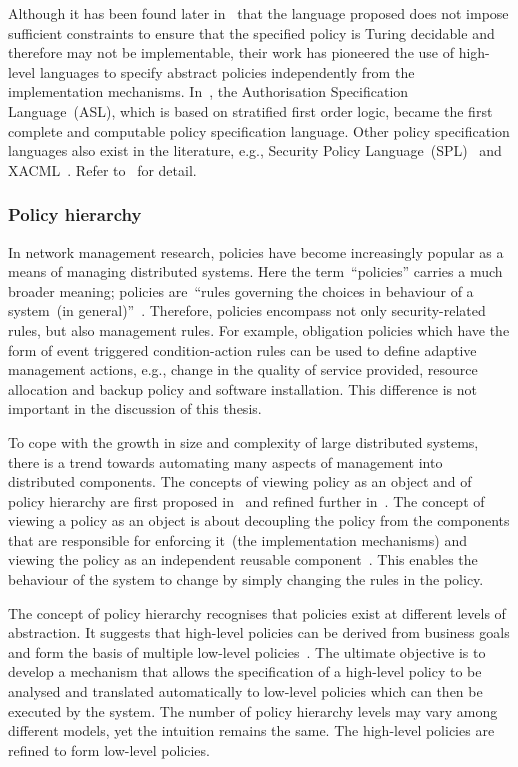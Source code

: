 Although it has been found later in~\cite{SJ01} that the language
proposed does not impose sufficient constraints to ensure that the
specified policy is Turing decidable and therefore may not be
implementable, their work has pioneered the use of high-level
languages to specify abstract policies independently from the
implementation mechanisms. In~\cite{SJ97,SJ97A}, the Authorisation
Specification Language~(ASL), which is based on stratified first order
logic, became the first complete and computable policy specification
language. Other policy specification languages also exist in the
literature, e.g., Security Policy Language~(SPL)~\cite{CNR01} and
XACML~\cite{SD03}. Refer to~\cite{MS02} for detail.

\subsubsection{Policy hierarchy}
In network management research, policies have become increasingly
popular as a means of managing distributed systems. Here the
term~``policies'' carries a much broader meaning; policies are~``rules
governing the choices in behaviour of a system~(in
general)''~\cite{MS94}. Therefore, policies encompass not only
security-related rules, but also management rules. For example,
obligation policies which have the form of event triggered
condition-action rules can be used to define adaptive management
actions, e.g., change in the quality of service provided, resource
allocation and backup policy and software installation. This
difference is not important in the discussion of this thesis.

To cope with the growth in size and complexity of large distributed
systems, there is a trend towards automating many aspects of
management into distributed components. The concepts of viewing policy
as an object and of policy hierarchy are first proposed
in~\cite{JDM91} and refined further in~\cite{JDM93,JDM93A}. The
concept of viewing a policy as an object is about decoupling the
policy from the components that are responsible for enforcing it~(the
implementation mechanisms) and viewing the policy as an independent
reusable component~\cite{JDM91}. This enables the behaviour of the
system to change by simply changing the rules in the policy.

The concept of policy hierarchy recognises that policies exist at
different levels of abstraction. It suggests that high-level policies
can be derived from business goals and form the basis of multiple
low-level policies~\cite{JDM91,JDM93}. The ultimate objective is to
develop a mechanism that allows the specification of a high-level
policy to be analysed and translated automatically to low-level
policies which can then be executed by the system. The number of
policy hierarchy levels may vary among different models, yet the
intuition remains the same. The high-level policies are refined to
form low-level policies.

